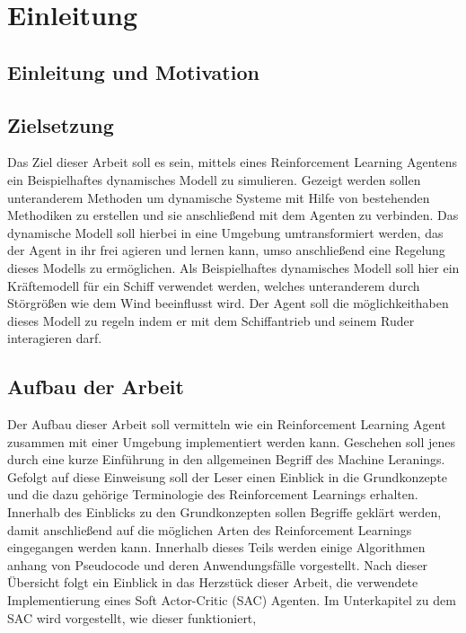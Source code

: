 \documentclass[]{iat}
\begin{document}
\graphicspath{{./project_graphics/}}



\tableofcontents

\newpage

\chapter{Einleitung}

\section{Einleitung und Motivation}

\section{Zielsetzung}
Das Ziel dieser Arbeit soll es sein, mittels eines Reinforcement Learning Agentens ein Beispielhaftes dynamisches Modell zu simulieren. Gezeigt werden sollen unteranderem Methoden um dynamische Systeme mit Hilfe von bestehenden Methodiken zu erstellen und sie anschließend mit dem Agenten zu verbinden. Das dynamische Modell soll hierbei in eine Umgebung umtransformiert werden, das der Agent in ihr frei agieren und lernen kann, umso anschließend eine Regelung dieses Modells zu ermöglichen. Als Beispielhaftes dynamisches Modell soll hier ein Kräftemodell für ein Schiff verwendet werden, welches unteranderem durch Störgrößen wie dem Wind beeinflusst wird. Der Agent soll die möglichkeithaben dieses Modell zu regeln indem er mit dem Schiffantrieb und seinem Ruder interagieren darf.
\section{Aufbau der Arbeit}
Der Aufbau dieser Arbeit soll vermitteln wie ein Reinforcement Learning Agent zusammen mit einer Umgebung implementiert werden kann. Geschehen soll jenes durch eine kurze Einführung in den allgemeinen Begriff des Machine Leranings. Gefolgt auf diese Einweisung soll der Leser einen Einblick in die Grundkonzepte und die dazu gehörige Terminologie des Reinforcement Learnings erhalten. Innerhalb des Einblicks zu den Grundkonzepten sollen Begriffe geklärt werden, damit anschließend auf die möglichen Arten des Reinforcement Learnings eingegangen werden kann. Innerhalb dieses Teils werden einige Algorithmen anhang von Pseudocode und deren Anwendungsfälle vorgestellt. Nach dieser Übersicht folgt ein Einblick in das Herzstück dieser Arbeit, die verwendete Implementierung eines Soft Actor-Critic (SAC) Agenten. Im Unterkapitel zu dem SAC wird vorgestellt, wie dieser funktioniert,
\end{document}

